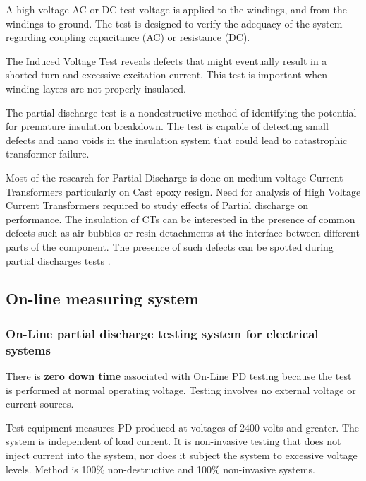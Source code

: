\begin{description}[style=nextline ]
 \item[Applied Voltage or Dielectric Test] A high voltage AC or DC test voltage is applied to the windings, and from the windings to ground. The test is designed to verify the adequacy of the system regarding coupling capacitance (AC) or resistance (DC).
 
 \item[Induced Voltage Test] The Induced Voltage Test reveals defects that might eventually result in a shorted turn and excessive excitation current. This test is important when winding layers are not properly insulated.
 
 \item[Partial Discharge (Corona) Test] The partial discharge test is a nondestructive method of identifying the potential for premature insulation breakdown. The test is capable of detecting small defects and nano voids in the insulation system that could lead to catastrophic transformer failure.
 \end{description}
 
Most of the research for Partial Discharge is done on medium voltage Current Transformers particularly on Cast epoxy resign. Need for analysis of High Voltage Current Transformers required to study effects of Partial discharge on performance. The insulation of CTs can be interested in the presence of common defects such as air bubbles or resin detachments at the interface between different parts of the component. The presence of such defects can be spotted during partial discharges tests \cite{sokolov1999effective}\setlength{\parskip}{0em}.
 
\subsection{On-line measuring system}

\subsubsection{On-Line partial discharge testing system for electrical systems}

There is \textbf{zero down time} associated with On-Line PD testing because the test is performed at normal operating voltage. Testing involves no external voltage or current sources\setlength{\parskip}{1em}.

Test equipment measures PD produced at voltages of 2400 volts and greater. The system is independent of load current. It is non-invasive testing that does not inject current into the system, nor does it subject the system to excessive voltage levels. Method is 100\% non-destructive and 100\% non-invasive systems.

